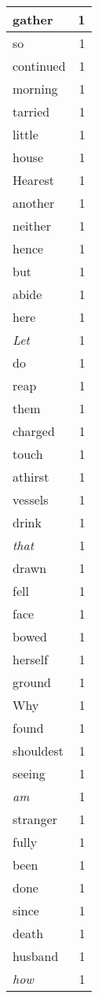 \begin{center}
\begin{longtable}{l|r}
gather & 1 \\ \hline
so & 1 \\ \hline
continued & 1 \\ \hline
morning & 1 \\ \hline
tarried & 1 \\ \hline
little & 1 \\ \hline
house & 1 \\ \hline
Hearest & 1 \\ \hline
another & 1 \\ \hline
neither & 1 \\ \hline
hence & 1 \\ \hline
but & 1 \\ \hline
abide & 1 \\ \hline
here & 1 \\ \hline
\emph{Let} & 1 \\ \hline
do & 1 \\ \hline
reap & 1 \\ \hline
them & 1 \\ \hline
charged & 1 \\ \hline
touch & 1 \\ \hline
athirst & 1 \\ \hline
vessels & 1 \\ \hline
drink & 1 \\ \hline
\emph{that} & 1 \\ \hline
drawn & 1 \\ \hline
fell & 1 \\ \hline
face & 1 \\ \hline
bowed & 1 \\ \hline
herself & 1 \\ \hline
ground & 1 \\ \hline
Why & 1 \\ \hline
found & 1 \\ \hline
shouldest & 1 \\ \hline
seeing & 1 \\ \hline
\emph{am} & 1 \\ \hline
stranger & 1 \\ \hline
fully & 1 \\ \hline
been & 1 \\ \hline
done & 1 \\ \hline
since & 1 \\ \hline
death & 1 \\ \hline
husband & 1 \\ \hline
\emph{how} & 1 \\ \hline

\end{longtable}
\end{center}

